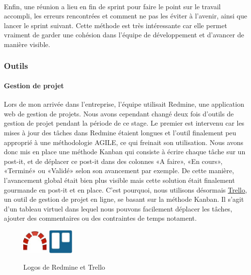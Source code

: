 \paragraph{}Enfin, une réunion a lieu en fin de sprint pour faire le point sur le travail accompli, les erreurs rencontrées et comment ne pas les éviter à l'avenir, ainsi que lancer le sprint suivant. Cette méthode est très intéressante car elle permet vraiment de garder une cohésion dans l’équipe de développement et d’avancer de manière visible. 

	\subsubsection{Outils}
		\paragraph{Gestion de projet\\}
Lors de mon arrivée dans l'entreprise, l’équipe utilisait Redmine, une application web de gestion de projets. Nous avons cependant changé deux fois d'outils de gestion de projet pendant la période de ce stage. Le premier est intervenu car les mises à jour des tâches dans Redmine étaient longues et l'outil finalement peu approprié à une méthodologie AGILE, ce qui freinait son utilisation. Nous avons donc mis en place une méthode Kanban qui consiste à écrire chaque tâche sur un post-it, et de déplacer ce post-it dans des colonnes «A faire», «En cours», «Terminé» ou «Validé» selon son avancement par exemple. De cette manière, l’avancement global était bien plus visible mais cette solution était finalement gourmande en post-it et en place. C'est pourquoi, nous utilisons désormais \href{www.trello.com}{Trello}, un outil de gestion de projet en ligne, se basant sur la méthode Kanban. Il s’agit d’un tableau virtuel dans lequel nous pouvons facilement déplacer les tâches, ajouter des commentaires ou des contraintes de temps notament.

	\begin{figure}[!h]
		\centering
		\includegraphics[height=48px]{images/redmine.jpg}
		\includegraphics[height=48px]{images/trello.jpg}
		\caption{Logos de Redmine et Trello}
		\label{Logos de Redmine et Trello}
	\end{figure}

